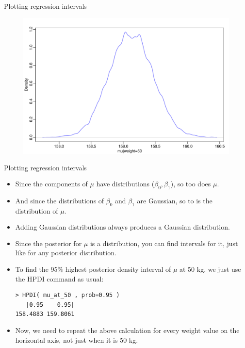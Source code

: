 \documentclass[handout]{beamer}
\begin{document}
\begin{frame}{Plotting regression intervals}

\begin{figure}[h!]
	\centering
	\includegraphics[scale=0.45]{pics/mu50.pdf}
\end{figure}

\end{frame}


\begin{frame}[fragile]{Plotting regression intervals}
\scriptsize{
\begin{itemize}
\item Since the components of $\mu$ have distributions ($\beta_0,\beta_1$), so too does $\mu$.

\item And since the distributions of $\beta_0$ and $\beta_1$ are Gaussian, so to is the distribution of $\mu$.

\item Adding Gaussian distributions always produces a Gaussian distribution.

\item Since the posterior for $\mu$ is a distribution, you can find intervals for it, just like for any posterior distribution. 

\item To find the 95\% highest posterior density interval of $\mu$ at 50 kg, we just use the HPDI command as usual:

\begin{verbatim}
> HPDI( mu_at_50 , prob=0.95 )
   |0.95    0.95| 
158.4883 159.8061  
\end{verbatim}

\item Now, we need to repeat the above calculation for every weight value on the horizontal axis, not just when it is 50 kg.

\end{itemize}
 

 
}
\end{frame}
\end{document}
